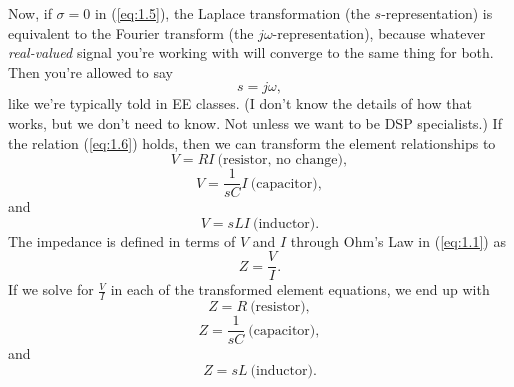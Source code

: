 Now, if $\sigma = 0$ in (\ref{eq:1.5}), the Laplace transformation (the $s$-representation) is equivalent to the Fourier transform (the $j \omega$-representation), because whatever \textit{real-valued} signal you're working with will converge to the same thing for both. Then you're allowed to say
\begin{equation}
\label{eq:1.6}
s = j \omega,
\end{equation}
like we're typically told in EE classes. (I don't know the details of how that works, but we don't need to know. Not unless we want to be DSP specialists.)
If the relation (\ref{eq:1.6}) holds, then we can transform the element relationships to
\begin{equation}
\label{eq:1.7}
V = R I ~\text{(resistor, no change)},
\end{equation}
\begin{equation}
\label{eq:1.8}
V = \frac{1}{s C} I ~\text{(capacitor)},
\end{equation}
and
\begin{equation}
\label{eq:1.9}
V = s L I ~\text{(inductor)}.
\end{equation}
The impedance is defined in terms of $V$ and $I$ through Ohm's Law in (\ref{eq:1.1}) as
\begin{equation}
\label{eq:1.10}
Z = \frac{V}{I}.
\end{equation}
If we solve for $\frac{V}{I}$ in each of the transformed element equations, we end up with
\begin{equation}
\label{eq:1.11}
Z = R ~\text{(resistor)},
\end{equation}
\begin{equation}
\label{eq:1.12}
Z = \frac{1}{s C} ~\text{(capacitor)},
\end{equation}
and
\begin{equation}
\label{eq:1.13}
Z = s L ~\text{(inductor)}.
\end{equation}
